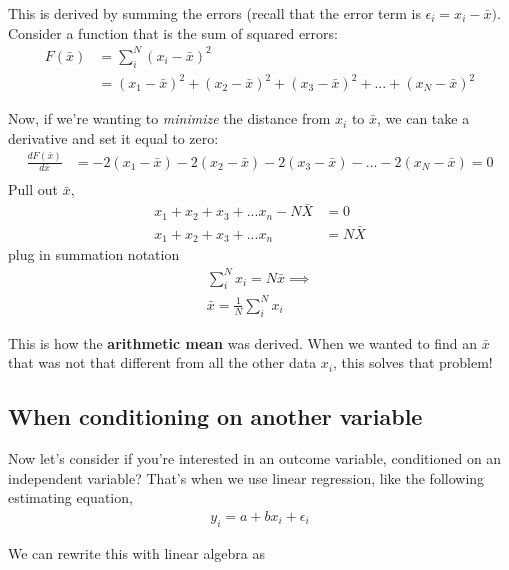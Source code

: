 \documentclass{article}
\begin{document}
This is derived by summing the errors (recall that the error term is $\epsilon_i = x_i - \bar x)$. \\

Consider a function that is the sum of squared errors:
\begin{align}
    F(\bar x) &= \sum_i^N (x_i - \bar x)^2\\
    &= (x_1 - \bar x)^2 + (x_2 - \bar x)^2  + (x_3 - \bar x)^2 +... + (x_N - \bar x)^2
\end{align}

Now, if we're wanting to \textit{minimize} the distance from $x_i$ to $\bar x$, we can take a derivative and set it equal to zero: 
\begin{align}
    \frac{d F(\bar x)}{d\bar x} &= -2(x_1 - \bar x)  -2(x_2 - \bar x) -2(x_3 - \bar x) - ... -2(x_N - \bar x) = 0\\
\end{align}
Pull out $\bar x$, 
\begin{align}
    x_1 + x_2 + x_3 + ... x_n - N \bar X &= 0\\
    x_1 + x_2 + x_3 + ... x_n &= N \bar X
\end{align}
plug in summation notation 
\begin{align}
    \sum_i^N x_i = N \bar x \implies \\
    \bar x = \frac{1}{N}\sum_i^N x_i
\end{align}

This is how the \textbf{arithmetic mean} was derived. When we wanted to find an $\bar x$ that was not that different from all the other data $x_i$, this solves that problem! 



\subsection{When conditioning on another variable}
Now let's consider if you're interested in an outcome variable, conditioned on an independent variable? That's when we use linear regression, like the following estimating equation,
\begin{align}
    y_i = a + bx_i + \epsilon_i
\end{align}

We can rewrite this with linear algebra as
\end{document}
